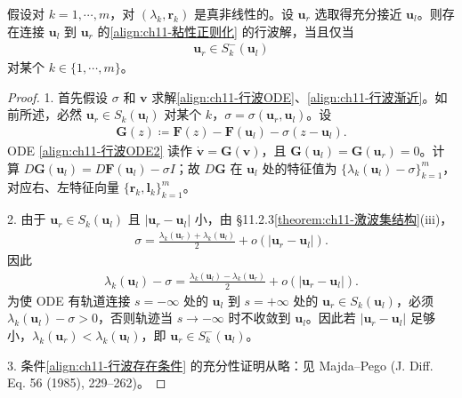 \documentclass[../../main.tex]{subfiles}
\begin{document}
\begin{theorem}[真非线性系统的行波存在性。]\label{theorem:ch11-真非线性系统行波存在性}假设对 $k=1,\cdots,m$，对 $(\lambda_k,\mathbf{r}_k)$ 是真非线性的。设 $\mathbf{u}_r$ 选取得充分接近 $\mathbf{u}_l$。则存在连接 $\mathbf{u}_l$ 到 $\mathbf{u}_r$ 的\eqref{align:ch11-粘性正则化} 的行波解，当且仅当
\begin{align}
\mathbf{u}_r\in S_k^-(\mathbf{u}_l)
\label{align:ch11-行波存在条件}
\end{align}
对某个 $k\in\{1,\cdots,m\}$。
\end{theorem}

\begin{proof}
1. 首先假设 $\sigma$ 和 $\mathbf{v}$ 求解\eqref{align:ch11-行波ODE}、\eqref{align:ch11-行波渐近}。如前所述，必然 $\mathbf{u}_r\in S_k(\mathbf{u}_l)$ 对某个 $k$，$\sigma=\sigma(\mathbf{u}_r,\mathbf{u}_l)$。设
\begin{align*}
\mathbf{G}(z)\coloneqq\mathbf{F}(z)-\mathbf{F}(\mathbf{u}_l)-\sigma(z-\mathbf{u}_l).
\end{align*}
ODE \eqref{align:ch11-行波ODE2} 读作 $\dot{\mathbf{v}}=\mathbf{G}(\mathbf{v})$，且 $\mathbf{G}(\mathbf{u}_l)=\mathbf{G}(\mathbf{u}_r)=0$。计算 $D\mathbf{G}(\mathbf{u}_l)=D\mathbf{F}(\mathbf{u}_l)-\sigma I$；故 $D\mathbf{G}$ 在 $\mathbf{u}_l$ 处的特征值为 $\{\lambda_k(\mathbf{u}_l)-\sigma\}_{k=1}^m$，对应右、左特征向量 $\{\mathbf{r}_k,\mathbf{l}_k\}_{k=1}^m$。

2. 由于 $\mathbf{u}_r\in S_k(\mathbf{u}_l)$ 且 $|\mathbf{u}_r-\mathbf{u}_l|$ 小，由 \S11.2.3\cref{theorem:ch11-激波集结构}(iii)，
\begin{align*}
\sigma=\frac{\lambda_k(\mathbf{u}_r)+\lambda_k(\mathbf{u}_l)}{2}+o(|\mathbf{u}_r-\mathbf{u}_l|).
\end{align*}
因此
\begin{align*}
\lambda_k(\mathbf{u}_l)-\sigma=\frac{\lambda_k(\mathbf{u}_l)-\lambda_k(\mathbf{u}_r)}{2}+o(|\mathbf{u}_r-\mathbf{u}_l|).
\end{align*}
为使 ODE 有轨道连接 $s=-\infty$ 处的 $\mathbf{u}_l$ 到 $s=+\infty$ 处的 $\mathbf{u}_r\in S_k(\mathbf{u}_l)$，必须 $\lambda_k(\mathbf{u}_l)-\sigma>0$，否则轨迹当 $s\to-\infty$ 时不收敛到 $\mathbf{u}_l$。因此若 $|\mathbf{u}_r-\mathbf{u}_l|$ 足够小，$\lambda_k(\mathbf{u}_r)<\lambda_k(\mathbf{u}_l)$，即 $\mathbf{u}_r\in S_k^-(\mathbf{u}_l)$。

3. 条件\eqref{align:ch11-行波存在条件} 的充分性证明从略：见 Majda--Pego (J. Diff. Eq. 56 (1985), 229--262)。
\end{proof}
\end{document}
